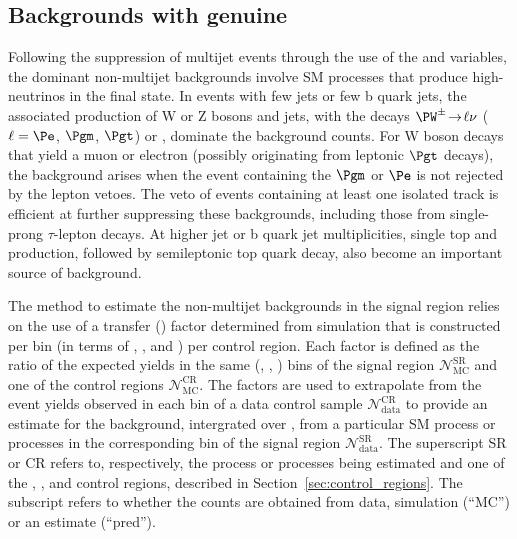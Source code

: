 \subsection{Backgrounds with genuine \texorpdfstring{\ETmiss}{MET}}
\label{sec:ewk_background}

Following the suppression of multijet events through the use of the
\alphat and \bdphi variables, the dominant non-multijet backgrounds
involve SM processes that produce high-\Pt neutrinos in the final
state. In events with few jets or few b quark jets, the associated
production of W or Z bosons and jets, with the decays $\PW^\pm
\!\rightarrow\! \ell\nu$ ($\ell=\Pe$, $\Pgm$, $\Pgt$) or \znunu,
dominate the background counts. For W boson decays that yield a muon
or electron (possibly originating from leptonic $\Pgt$ decays), the
background arises when the event containing the $\Pgm$ or $\Pe$ is not
rejected by the lepton vetoes. 
The veto of events containing at least one isolated track is efficient
at further suppressing these backgrounds, including those from
single-prong $\tau$-lepton decays. At higher jet or b quark jet
multiplicities, single top and \ttbar production, followed by
semileptonic top quark decay, also become an important source of
background.

The method to estimate the non-multijet backgrounds in the signal
region relies on the use of a transfer (\tf) factor determined from
simulation that is constructed per bin (in terms of \njet, \nb, and
\scalht) per control region. Each \tf factor is defined as the ratio
of the expected yields in the same (\njet, \nb, \scalht) bins of the
signal region $\mathcal{N}^\text{SR}_\text{MC}$ and one of the control
regions $\mathcal{N}^\text{CR}_\text{MC}$. The \tf factors are used to
extrapolate from the event yields observed in each bin of a data
control sample $\mathcal{N}^\text{CR}_\text{data}$ to provide an
estimate for the background, intergrated over \HTmiss, from a
particular SM process or processes in the corresponding bin of the
signal region $\mathcal{N}^\text{SR}_\text{data}$. The superscript SR
or CR refers to, respectively, the process or processes being
estimated and one of the \mj, \mmj, and \gj control regions, described
in Section~\ref{sec:control_regions}. The subscript refers to whether
the counts are obtained from data, simulation (``MC'') or an estimate
(``pred'').

